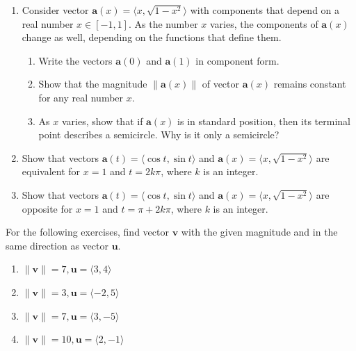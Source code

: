 \documentclass{exercises}
\begin{document}
\begin{enumerate}[resume]
\begin{enumerate}[label=(\alph*)]
  \item Write the vectors $\mathbf{a}(0)$ and $\mathbf{a}(\pi)$ in component form.
  \item Show that the magnitude $\|\mathbf{a}(t)\|$ of vector $\mathbf{a}(t)$ remains constant for any real number $t$.
  \item As $t$ varies, show that the terminal point of vector $\mathbf{a}(t)$ describes a circle centered at the origin of radius $1$.
\end{enumerate}
\item Consider vector $\mathbf{a}(x)=\langle x,\sqrt{1-x^{2}}\rangle$ with components that depend on a real number $x\in[-1,1]$. As the number $x$ varies, the components of $\mathbf{a}(x)$ change as well, depending on the functions that define them.
\begin{enumerate}[label=(\alph*)]
  \item Write the vectors $\mathbf{a}(0)$ and $\mathbf{a}(1)$ in component form.
  \item Show that the magnitude $\|\mathbf{a}(x)\|$ of vector $\mathbf{a}(x)$ remains constant for any real number $x$.
  \item As $x$ varies, show that if $\mathbf{a}(x)$ is in standard position, then its terminal point describes a semicircle. Why is it only a semicircle?
\end{enumerate}
\item Show that vectors $\mathbf{a}(t)=\langle \cos t,\sin t\rangle$ and $\mathbf{a}(x)=\langle x,\sqrt{1-x^{2}}\rangle$ are equivalent for $x=1$ and $t=2k\pi$, where $k$ is an integer.
\item Show that vectors $\mathbf{a}(t)=\langle \cos t,\sin t\rangle$ and $\mathbf{a}(x)=\langle x,\sqrt{1-x^{2}}\rangle$ are opposite for $x=1$ and $t=\pi+2k\pi$, where $k$ is an integer.
\end{enumerate}

For the following exercises, find vector $\mathbf{v}$ with the given magnitude and in the same direction as vector $\mathbf{u}$.

\begin{enumerate}[resume]
\item $\|\mathbf{v}\|=7,\mathbf{u}=\langle3,4\rangle$
\item $\|\mathbf{v}\|=3,\mathbf{u}=\langle-2,5\rangle$
\item $\|\mathbf{v}\|=7,\mathbf{u}=\langle3,-5\rangle$
\item $\|\mathbf{v}\|=10,\mathbf{u}=\langle2,-1\rangle$
\end{enumerate}
\end{document}
